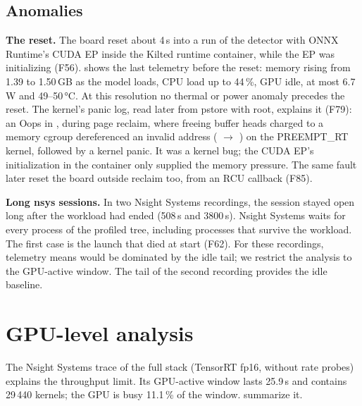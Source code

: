 \documentclass[11pt,a4paper]{article}
\newcommand{\finding}[1]{\textsf{\small F#1}}
\begin{document}
\subsection{Anomalies}\label{sec:anomalies}
\textbf{The reset.} The board reset about 4\,s into a run of the detector with ONNX Runtime's CUDA EP inside the Kilted
runtime container, while the EP was initializing (\finding{56}).  shows the last telemetry before the
reset: memory rising from 1.39 to 1.50\,GB as the model loads, CPU load up to 44\,\%, GPU idle, at most 6.7\,W and
49--50\,\si{\celsius}. At this resolution no thermal or power anomaly precedes the reset. The kernel's panic log, read
later from pstore with root, explains it (\finding{79}): an Oops in , during page reclaim, where freeing
buffer heads charged to a memory cgroup dereferenced an invalid address ( $\to$
) on the PREEMPT\_RT kernel, followed by a kernel panic. It was a kernel bug; the CUDA EP's
initialization in the container only supplied the memory pressure. The same fault later reset the board outside
reclaim too, from an RCU callback (\finding{85}).

\textbf{Long nsys sessions.} In two Nsight Systems recordings, the session stayed open long after the workload had
ended (508\,s and 3800\,s). Nsight Systems waits for every process of the profiled tree, including processes that
survive the workload. The first case is the launch that died at start (\finding{62}). For these recordings, telemetry
means would be dominated by the idle tail; we restrict the analysis to the GPU-active window. The tail of the second
recording provides the idle baseline.

\section{GPU-level analysis}\label{sec:gpu}
The Nsight Systems trace of the full stack (TensorRT fp16, without rate probes) explains the throughput limit. Its
GPU-active window lasts 25.9\,s and contains 29\,440 kernels; the GPU is busy 11.1\,\% of the window.
 summarize it.
\end{document}
